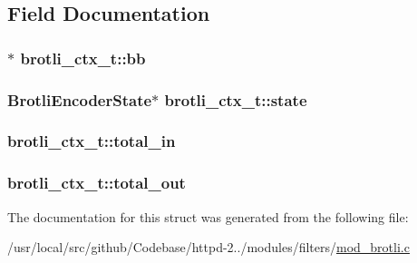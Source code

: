 \subsection{Field Documentation}
\subsubsection[{\texorpdfstring{bb}{bb}}]{$\ast$ brotli\+\_\+ctx\+\_\+t\+::bb}\hypertarget{structbrotli__ctx__t_a4d739d1178c45be67c806d189fbb3d4e}{}\label{structbrotli__ctx__t_a4d739d1178c45be67c806d189fbb3d4e}
\subsubsection[{\texorpdfstring{state}{state}}]{\setlength{\rightskip}{0pt plus 5cm}Brotli\+Encoder\+State$\ast$ brotli\+\_\+ctx\+\_\+t\+::state}\hypertarget{structbrotli__ctx__t_abfd14ab6f7cbdaf2bfb6710790393a47}{}\label{structbrotli__ctx__t_abfd14ab6f7cbdaf2bfb6710790393a47}
\subsubsection[{\texorpdfstring{total\+\_\+in}{total_in}}]{ brotli\+\_\+ctx\+\_\+t\+::total\+\_\+in}\hypertarget{structbrotli__ctx__t_a35fd446b4c63516dfcc9fcff350466a9}{}\label{structbrotli__ctx__t_a35fd446b4c63516dfcc9fcff350466a9}
\subsubsection[{\texorpdfstring{total\+\_\+out}{total_out}}]{ brotli\+\_\+ctx\+\_\+t\+::total\+\_\+out}\hypertarget{structbrotli__ctx__t_a3d7612e4bdff4a7ded3e614700bfce09}{}\label{structbrotli__ctx__t_a3d7612e4bdff4a7ded3e614700bfce09}


The documentation for this struct was generated from the following file\+:\begin{DoxyCompactItemize}
\item 
/usr/local/src/github/\+Codebase/httpd-\/2../modules/filters/\hyperlink{mod__brotli_8c}{mod\+\_\+brotli.\+c}\end{DoxyCompactItemize}
